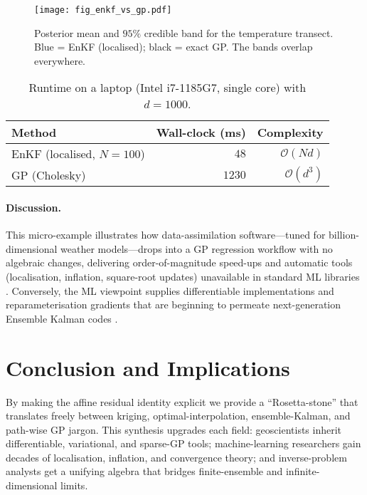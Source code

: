 \documentclass[wcp]{jmlr} %
\begin{document}
\begin{figure}
  \centering
  \texttt{[image: fig\_enkf\_vs\_gp.pdf]}
  \caption{Posterior mean and $95\%$ credible band for the temperature
  transect.  Blue = EnKF (localised); black = exact GP.  The bands
  overlap everywhere.}
  \label{fig:demo}
\end{figure}

\begin{table}
  \centering
  \begin{tabular}{lrr}
    \toprule
    Method & Wall-clock (ms) & Complexity \\
    \midrule
    EnKF (localised, $N=100$) & $48$ & $\mathcal O(Nd)$ \\
    GP (Cholesky)             & $1230$ & $\mathcal O(d^{3})$ \\
    \bottomrule
  \end{tabular}
  \caption{Runtime on a laptop (Intel i7-1185G7, single core) with
  $d=1000$.}
  \label{tab:timings}
\end{table}

\paragraph{Discussion.}
This micro-example illustrates how data-assimilation
software—tuned for billion-dimensional weather models—drops into a GP
regression workflow with no algebraic changes, delivering order-of-magnitude speed-ups and automatic tools
(localisation, inflation, square-root updates) unavailable in standard
ML libraries
 \citep{Evensen2003EnKF,Wilson2020Efficiently,Kuzin2018GPEnKF}.
Conversely, the ML viewpoint supplies differentiable implementations
and reparameterisation gradients that are beginning to permeate
next-generation Ensemble Kalman codes \citep{Borovitskiy2020Matern,Rasmussen2006GPML}.



\section{Conclusion and Implications}

By making the affine residual identity explicit we provide a ``Rosetta-stone'' that translates freely between kriging, optimal-interpolation, ensemble-Kalman, and path-wise GP jargon.  This synthesis upgrades each field: geoscientists inherit differentiable, variational, and sparse-GP tools; machine-learning researchers gain decades of localisation, inflation, and convergence theory; and inverse-problem analysts get a unifying algebra that bridges finite-ensemble and infinite-dimensional limits.
\end{document}
